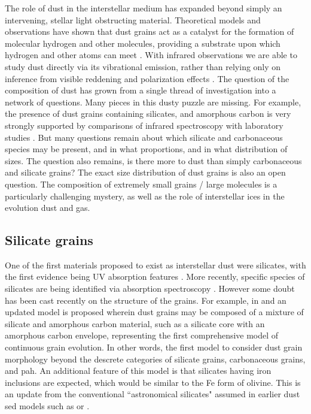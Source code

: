   The role of dust in the interstellar medium has expanded beyond simply an intervening, stellar light obstructing material. Theoretical models and observations have shown that dust grains act as a catalyst for the formation of molecular hydrogen and other molecules, providing a substrate upon which hydrogen and other atoms can meet \citep{iglesias77,burke83}. With infrared observations we are able to study dust directly via its vibrational emission, rather than relying only on inference from visible reddening and polarization effects \citep{davis51,platt56, carrasco73}.
   The question of the composition of dust has grown from a single thread of investigation into a network of questions. Many pieces in this dusty puzzle are missing. For example, the presence of dust grains containing silicates, and amorphous carbon is very strongly supported by comparisons of infrared spectroscopy with laboratory studies \citep{hagen79,joblin09}. But many questions remain about which silicate and carbonaceous species may be present, and in what proportions, and in what distribution of sizes. The question also remains, is there more to dust than simply carbonaceous and silicate grains?  The exact size distribution of dust grains is also an open question. The composition of extremely small grains / large molecules is a particularly challenging mystery, as well as the role of interstellar ices in the evolution dust and gas.

\subsection{Silicate grains}
     One of the first materials proposed to exist as interstellar dust were silicates, with the first evidence being UV absorption features \citep{knacke69}. More recently, specific species of silicates are being identified via absorption spectroscopy \citep{olofsson12}. However some doubt has been cast recently on the structure of the grains. For example, in \cite{jones13} and \cite{jones14} an updated model is proposed wherein dust grains may be composed of a mixture of silicate and amorphous carbon material, such as a silicate core with an amorphous carbon envelope, representing the first comprehensive model of continuous grain evolution. In other words, the first model to consider dust grain morphology beyond the descrete categories of silicate grains, carbonaceous grains, and \acrlong{pah}. An additional feature of this model is that silicates having iron inclusions are expected, which would be similar to the Fe form of olivine. This is an update from the conventional ``astronomical  silicates" assumed in earlier dust \acrlong{sed} models such as \cite{li01} or \cite{dustem11}.

